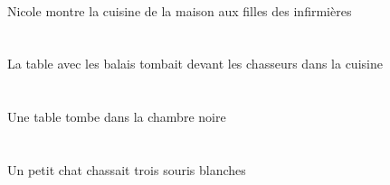 \begin{exe}
\INDSgErgG{}   \NicoleBSgErgG{}    \DEFPlDatG{}    \DEFPlOblG{}   \infirmiereAPlOblG{}   \DEG{}   \filleCPlDatG{}   \DEFSgAbsG{}    \DEFSgOblG{}   \maisonDSgOblG{}   \DEG{}   \cuisineDSgAbsG{}  \montrerVdPrsDSgG{}\\
Nicole montre la cuisine de la maison aux filles des infirmières
\ex\glll
\DEFSgAbs{}    \DEFPlObl{}   \balaiAPlObl{}   \AVEC{}   \tableDSgAbs{}    \DEFPlObl{}    \DEFSgObl{}   \cuisineDSgObl{}   \DANS{}   \chasseurCPlObl{}   \DEVANT{}  \tomberViPstDSg{}\\
\DEFSgAbsP{}    \DEFPlOblP{}   \balaiAPlOblP{}   \AVECP{}   \tableDSgAbsP{}    \DEFPlOblP{}    \DEFSgOblP{}   \cuisineDSgOblP{}   \DANSP{}   \chasseurCPlOblP{}   \DEVANTP{}  \tomberViPstDSgP{}\\
\DEFSgAbsG{}    \DEFPlOblG{}   \balaiAPlOblG{}   \AVECG{}   \tableDSgAbsG{}    \DEFPlOblG{}    \DEFSgOblG{}   \cuisineDSgOblG{}   \DANSG{}   \chasseurCPlOblG{}   \DEVANTG{}  \tomberViPstDSgG{}\\
La table avec les balais tombait devant les chasseurs dans la cuisine
\ex\glll
\DEFSgObl{}   \noirBSg{}   \chambreBSgObl{}   \DANS{}   \INDSgAbs{}   \tableDSgAbs{}  \tomberViPrsDSg{}\\
\DEFSgOblP{}   \noirBSgP{}   \chambreBSgOblP{}   \DANSP{}   \INDSgAbsP{}   \tableDSgAbsP{}  \tomberViPrsDSgP{}\\
\DEFSgOblG{}   \noirBSgG{}   \chambreBSgOblG{}   \DANSG{}   \INDSgAbsG{}   \tableDSgAbsG{}  \tomberViPrsDSgG{}\\
Une table tombe dans la chambre noire
\ex\glll
\INDSgErg{}   \petitDSg{}   \chatDSgErg{}   \INDPlAbs{}   \troisBPl{}   \blancBPl{}   \sourisBPlAbs{}  \chasserVtPstBPl{}\\
\INDSgErgP{}   \petitDSgP{}   \chatDSgErgP{}   \INDPlAbsP{}   \troisBPlP{}   \blancBPlP{}   \sourisBPlAbsP{}  \chasserVtPstBPlP{}\\
\INDSgErgG{}   \petitDSgG{}   \chatDSgErgG{}   \INDPlAbsG{}   \troisBPlG{}   \blancBPlG{}   \sourisBPlAbsG{}  \chasserVtPstBPlG{}\\
Un petit chat chassait trois souris blanches
\ex\glll
\DEFPlAbs{}   \rougeAPl{}   \fruitAPlAbs{}    \DEFSgObl{}    \DEFSgObl{}    \INDSgObl{}   \NabilDSgObl{}   \DE{}   \filleCSgObl{}   \DE{}   \villageCSgObl{}   \DANS{}  \arriverViPrsAPl{}\\
\DEFPlAbsP{}   \rougeAPlP{}   \fruitAPlAbsP{}    \DEFSgOblP{}    \DEFSgOblP{}    \INDSgOblP{}   \NabilDSgOblP{}   \DEP{}   \filleCSgOblP{}   \DEP{}   \villageCSgOblP{}   \DANSP{}  \arriverViPrsAPlP{}\\

\end{exe}
